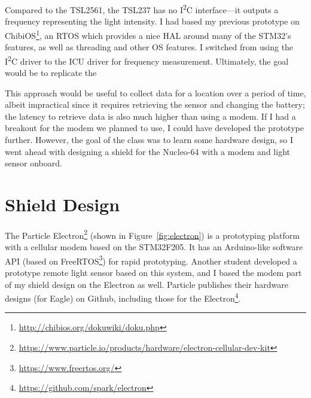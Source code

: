 \documentclass{article}
\begin{document}
Compared to the TSL2561, the TSL237 has no I\textsuperscript{2}C interface---it outputs a frequency representing the light intensity. I had based my previous prototype on ChibiOS\footnote{\url{http://chibios.org/dokuwiki/doku.php}}, an RTOS which provides a nice HAL around many of the STM32's features, as well as threading and other OS features. I switched from using the I\textsuperscript{2}C driver to the ICU driver for frequency measurement. Ultimately, the goal would be to replicate the 

This approach would be useful to collect data for a location over a period of time, albeit impractical since it requires retrieving the sensor and changing the battery; the latency to retrieve data is also much higher than using a modem. If I had a breakout for the modem we planned to use, I could have developed the prototype further. However, the goal of the class was to learn some hardware design, so I went ahead with designing a shield for the Nucleo-64 with a modem and light sensor onboard.

\section*{Shield Design}
The Particle Electron\footnote{\url{https://www.particle.io/products/hardware/electron-cellular-dev-kit}} (shown in Figure~\ref{fig:electron}) is a prototyping platform with a cellular modem based on the STM32F205. It has an Arduino-like software API (based on FreeRTOS\footnote{\url{https://www.freertos.org/}}) for rapid prototyping. Another student developed a prototype remote light sensor based on this system, and I based the modem part of my shield design on the Electron as well. Particle publishes their hardware designs (for Eagle) on Github, including those for the Electron\footnote{\url{https://github.com/spark/electron}}.
\end{document}
